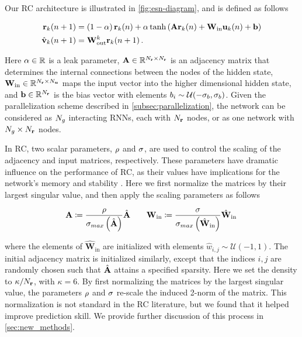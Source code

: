 Our RC architecture is illustrated in \cref{fig:esn-diagram}, and is defined as
follows
\begin{linenomath*}\begin{equation}
    \begin{aligned}
        \mathbf{r}_{k}(n+1)
        &=
        \left(1-\alpha\right)\mathbf{r}_{k}(n)
        +
        \alpha \tanh\left(
            \mathbf{A} \mathbf{r}_{k}(n) + \mathbf{W}_\text{in} \mathbf{u}_{k}(n) + \mathbf{b}
            \right)
             \\
        \hat{\mathbf{v}}_{k}(n+1)
        &= \mathbf{W}_\text{out}^{k} \mathbf{r}_{k}(n+1) \, .
    \end{aligned}
    \label{eq:rc}
\end{equation}\end{linenomath*}
Here
$\alpha\in\mathbb{R}$ is a leak parameter,
$\mathbf{A} \in \mathbb{R}^{N_{\mathbf{r}}\times N_{\mathbf{r}}}$ is an adjacency matrix that
determines the internal connections between the nodes of the hidden state,
$\mathbf{W}_\text{in} \in \mathbb{R}^{N_{\mathbf{r}}\times N_{\mathbf{u}}}$ maps the input vector
into the higher dimensional hidden state,
and $\mathbf{b}\in\mathbb{R}^{N_{\mathbf{r}}}$
is the bias vector with elements
$b_i \sim \mathcal{U}(-\sigma_{b},\sigma_{b})$.
Given the parallelization scheme described in \cref{subsec:parallelization},
the network can be considered as $N_{g}$ interacting RNNs, each with
$N_{\mathbf{r}}$ nodes, or as one network with $N_{g}\times N_{\mathbf{r}}$ nodes.

In RC, two scalar parameters, $\rho$ and $\sigma$,
are used to control the scaling of the adjacency and input matrices,
respectively.
These parameters have dramatic influence on the performance of RC, as their
values have implications for the network's memory and stability .
Here we first normalize the matrices by their largest singular value, and then
apply the scaling parameters as follows
\begin{linenomath*}\begin{equation*}
    \mathbf{A} \coloneqq
    \dfrac{\rho}{\sigma_{max}\left(\hat{\mathbf{A}}\right)}
    \hat{\mathbf{A}}
    \qquad
    \mathbf{W}_\text{in} \coloneqq
    \dfrac{\sigma}{\sigma_{max}\left(\hat{\mathbf{W}}_\text{in}\right)}
    \hat{\mathbf{W}}_\text{in} \,
\end{equation*}\end{linenomath*}
where the elements of $\hat{\mathbf{W}}_\text{in}$
are initialized with elements $\hat{w}_{i,j}\sim\mathcal{U}(-1,1)$.
The initial adjacency matrix is initialized similarly, except that the indices
$i,j$ are randomly chosen such that $\hat{\mathbf{A}}$ attains a specified
sparsity.
Here we set the density to $\kappa / N_{\mathbf{r}}$, with $\kappa=6$.
By first normalizing the matrices by the largest singular value, the parameters
$\rho$ and $\sigma$ re-scale the induced 2-norm of
the matrix.
This normalization is not standard in the RC literature, but we found that it
helped improve prediction skill.
We provide further discussion of this process in \cref{sec:new_methods}.

